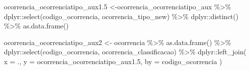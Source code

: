 \documentclass[
]{article}
\newenvironment{Shaded}{\begin{snugshade}}{\end{snugshade}}
\newcommand{\AttributeTok}[1]{\textcolor[rgb]{0.77,0.63,0.00}{#1}}
\newcommand{\FloatTok}[1]{\textcolor[rgb]{0.00,0.00,0.81}{#1}}
\newcommand{\FunctionTok}[1]{\textcolor[rgb]{0.00,0.00,0.00}{#1}}
\newcommand{\NormalTok}[1]{#1}
\newcommand{\OtherTok}[1]{\textcolor[rgb]{0.56,0.35,0.01}{#1}}
\newcommand{\SpecialCharTok}[1]{\textcolor[rgb]{0.00,0.00,0.00}{#1}}
\newcommand{\StringTok}[1]{\textcolor[rgb]{0.31,0.60,0.02}{#1}}
\begin{document}
\begin{Shaded}
\begin{Highlighting}[]
\NormalTok{ocorrencia\_ocorrenciatipo\_aux1}\FloatTok{.5} \OtherTok{\textless{}{-}}\NormalTok{ocorrencia\_ocorrenciatipo\_aux }\SpecialCharTok{\%\textgreater{}\%}\NormalTok{ dplyr}\SpecialCharTok{::}\FunctionTok{select}\NormalTok{(codigo\_ocorrencia,}
\NormalTok{                                                        ocorrencia\_tipo\_new) }\SpecialCharTok{\%\textgreater{}\%} 
\NormalTok{            dplyr}\SpecialCharTok{::}\FunctionTok{distinct}\NormalTok{() }\SpecialCharTok{\%\textgreater{}\%} \FunctionTok{as.data.frame}\NormalTok{()}

\NormalTok{ocorrencia\_ocorrenciatipo\_aux2 }\OtherTok{\textless{}{-}}\NormalTok{ ocorrencia }\SpecialCharTok{\%\textgreater{}\%}
    \FunctionTok{as.data.frame}\NormalTok{() }\SpecialCharTok{\%\textgreater{}\%} 
\NormalTok{    dplyr}\SpecialCharTok{::}\FunctionTok{select}\NormalTok{(codigo\_ocorrencia, ocorrencia\_classificacao) }\SpecialCharTok{\%\textgreater{}\%}
\NormalTok{    dplyr}\SpecialCharTok{::}\FunctionTok{left\_join}\NormalTok{(}
        \AttributeTok{x =}\NormalTok{ .,}
        \AttributeTok{y =}\NormalTok{ ocorrencia\_ocorrenciatipo\_aux1}\FloatTok{.5}\NormalTok{,}
        \AttributeTok{by =} \StringTok{\textquotesingle{}codigo\_ocorrencia\textquotesingle{}}
\NormalTok{    )}
\end{Highlighting}
\end{Shaded}
\end{document}
